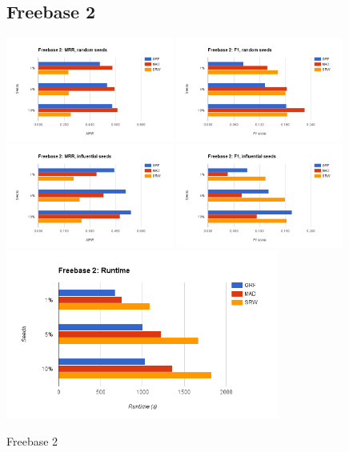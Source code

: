 \documentclass[12pt]{article}
\begin{document}
\begin{figure}[p]
    \subsection{Freebase 2}
    \centering
    \includegraphics[width=0.49\textwidth]{figures/freebase2-mrr-random}
    \includegraphics[width=0.49\textwidth]{figures/freebase2-f1-random}
    \includegraphics[width=0.49\textwidth]{figures/freebase2-mrr-top}
    \includegraphics[width=0.49\textwidth]{figures/freebase2-f1-top}
    \includegraphics[width=0.8\textwidth]{figures/freebase2-runtime}
    \caption{Freebase 2}
\end{figure}
\end{document}
